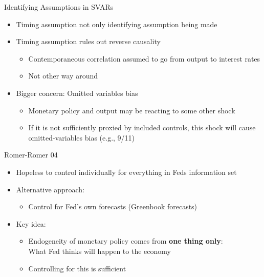\documentclass[11pt,aspectratio=169,xcolor={dvipsnames},hyperref={pdftex,pdfpagemode=UseNone,hidelinks,pdfdisplaydoctitle=true},usepdftitle=false]{beamer}
\begin{document}
\begin{frame}{Identifying Assumptions in SVARs}
\begin{itemize}
\itemsep1em 
\item Timing assumption not only identifying assumption being made
\item Timing assumption rules out reverse causality
\begin{itemize}
\item Contemporaneous correlation assumed to go from output to interest rates
\item Not other way around 
\end{itemize}
\item Bigger concern: Omitted variables bias
\begin{itemize}
\item Monetary policy and output may be reacting to some other shock
\item If it is not sufficiently proxied by included controls, this shock will cause \\ omitted-variables bias (e.g., 9/11)
\end{itemize}
\end{itemize}
\end{frame}

\begin{frame}{Romer-Romer 04}
\begin{itemize}
\itemsep1em 
\item Hopeless to control individually for everything in Feds information set
\item Alternative approach:
\begin{itemize}
\item Control for Fed's own forecasts (Greenbook forecasts)
\end{itemize}
\item Key idea: 
\begin{itemize}
\item Endogeneity of monetary policy comes from \textbf{one thing only}: \\ What Fed thinks will happen to the economy
\item Controlling for this is sufficient
\end{itemize}
\end{itemize}
\end{frame}
\end{document}
